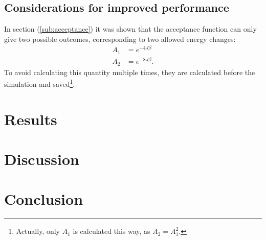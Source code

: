 \documentclass[english,notitlepage,reprint,nofootinbib]{revtex4-1}  %
\begin{document}
\subsection{Considerations for improved performance}

In section (\ref{sub:acceptance}) it was shown that the acceptance function can only give two possible outcomes, corresponding to two allowed energy changes:
\begin{equation}
    \begin{aligned}
        A_1 &= e^{-4J\beta} \\
        A_2 &= e^{-8J\beta}.
    \end{aligned}
\end{equation}
To avoid calculating this quantity multiple times, they are calculated before the simulation and saved\footnote{Actually, only $A_1$ is calculated this way, as $A_2 = A_1^2$.}.



\newpage
\section{Results}\label{sec:results}
%



\section{Discussion}\label{sec:discussion}
%

\section{Conclusion}\label{sec:conclusion}


\onecolumngrid

%

\end{document}
